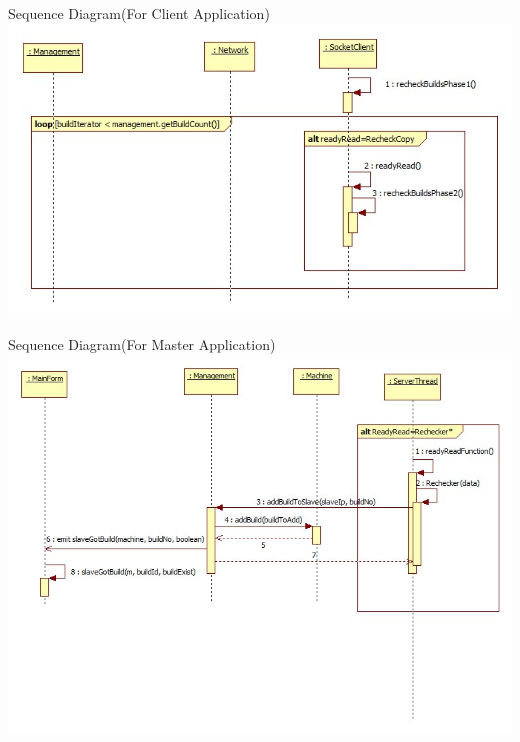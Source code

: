 \documentclass[a4paper,12pt,final]{article}
\begin{document}
\newpage
\begin{center}
Sequence Diagram(For Client Application)
\includegraphics[scale=0.5]{CommunicationProtocol/SequenceDiagrams/Client/SlaveCurrentBuilds.jpg} 
\end{center}
\begin{center}
Sequence Diagram(For Master Application)
\includegraphics[scale=0.5]{CommunicationProtocol/SequenceDiagrams/Server/SlaveCurrentBuilds.jpeg} 
\end{center}



\end{document}
